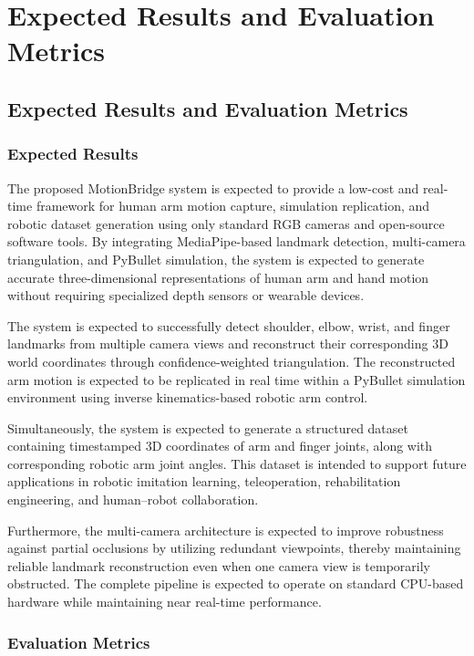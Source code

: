 
\chapter{Expected Results and Evaluation Metrics}
\section{Expected Results and Evaluation Metrics}

\subsection{Expected Results}

The proposed MotionBridge system is expected to provide a low-cost and real-time framework for human arm motion capture, simulation replication, and robotic dataset generation using only standard RGB cameras and open-source software tools. By integrating MediaPipe-based landmark detection, multi-camera triangulation, and PyBullet simulation, the system is expected to generate accurate three-dimensional representations of human arm and hand motion without requiring specialized depth sensors or wearable devices.

The system is expected to successfully detect shoulder, elbow, wrist, and finger landmarks from multiple camera views and reconstruct their corresponding 3D world coordinates through confidence-weighted triangulation. The reconstructed arm motion is expected to be replicated in real time within a PyBullet simulation environment using inverse kinematics-based robotic arm control.

Simultaneously, the system is expected to generate a structured dataset containing timestamped 3D coordinates of arm and finger joints, along with corresponding robotic arm joint angles. This dataset is intended to support future applications in robotic imitation learning, teleoperation, rehabilitation engineering, and human--robot collaboration.

Furthermore, the multi-camera architecture is expected to improve robustness against partial occlusions by utilizing redundant viewpoints, thereby maintaining reliable landmark reconstruction even when one camera view is temporarily obstructed. The complete pipeline is expected to operate on standard CPU-based hardware while maintaining near real-time performance.

\subsection{Evaluation Metrics}

